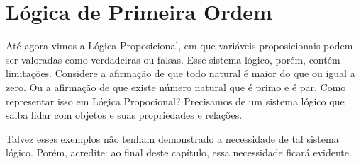 \newenvironment{bprooftree}
{\leavevmode\hbox\bgroup}
{\DisplayProof\egroup}
  
\chapter{Lógica de Primeira Ordem}
    
    Até agora vimos a Lógica Proposicional, em que variáveis proposicionais podem ser valoradas como verdadeiras ou falsas. Esse sistema lógico, porém, contém limitações. Considere a afirmação de que todo natural é maior do que ou igual a zero.
    Ou a afirmação de que existe número natural que é primo e é par. Como representar isso em Lógica Propocional? Precisamos de um sistema lógico que saiba lidar com objetos e suas propriedades e relações.

    Talvez esses exemplos não tenham demonstrado a necessidade de tal sistema lógico. Porém, acredite: ao final deste capítulo, essa necessidade ficará evidente.

    
    
    
    
    
